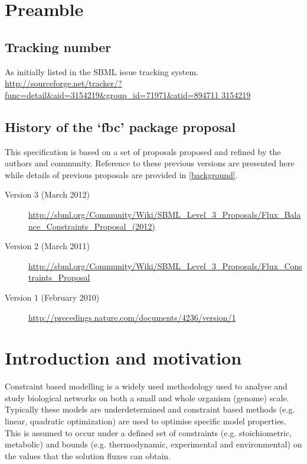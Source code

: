 
\section{Preamble}
\label{preamble}

\subsection{ Tracking number }
As initially listed in the SBML issue tracking system. \url{http://sourceforge.net/tracker/?func=detail&aid=3154219&group_id=71971&atid=894711
3154219}

\subsection{ History of the `fbc' package proposal }
This specification is based on a set of proposals proposed and refined by the authors and \SBML community. Reference to these previous versions are presented here while details of previous proposals are provided in \ref{background}.

\begin{description}
  \item[Version 3 (March 2012)]
  \item [] \url{http://sbml.org/Community/Wiki/SBML_Level_3_Proposals/Flux_Balance_Constraints_Proposal_(2012)}
  \item[Version 2 (March 2011)]
  \item [] \url{http://sbml.org/Community/Wiki/SBML_Level_3_Proposals/Flux_Constraints_Proposal}
  \item[Version 1 (February 2010)]
  \item [] \url{http://precedings.nature.com/documents/4236/version/1}
\end{description}


\section{ Introduction and motivation }
\label{intro}

Constraint based modelling is a widely used methodology used to analyse and study biological networks on both a small and whole organism (genome) scale. Typically these models are underdetermined and constraint based methods (e.g. linear, quadratic optimization) are used to optimise specific model properties. This is assumed to occur under a defined set of constraints (e.g. stoichiometric, metabolic) and bounds (e.g. thermodynamic, experimental and environmental) on the values that the solution fluxes can obtain.

